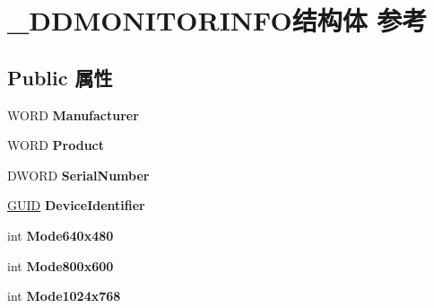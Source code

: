 \hypertarget{struct___d_d_m_o_n_i_t_o_r_i_n_f_o}{}\section{\+\_\+\+D\+D\+M\+O\+N\+I\+T\+O\+R\+I\+N\+F\+O结构体 参考}
\label{struct___d_d_m_o_n_i_t_o_r_i_n_f_o}
\subsection*{Public 属性}
\begin{DoxyCompactItemize}
\item 
\mbox{\label{struct___d_d_m_o_n_i_t_o_r_i_n_f_o_a0c4b7395b513639ca186caef7311f77b}} 
W\+O\+RD {\bfseries Manufacturer}
\item 
\mbox{\label{struct___d_d_m_o_n_i_t_o_r_i_n_f_o_a156665f939b835820e175f2d6113224d}} 
W\+O\+RD {\bfseries Product}
\item 
\mbox{\label{struct___d_d_m_o_n_i_t_o_r_i_n_f_o_a01c1932155065ae40ebde50055bbad7f}} 
D\+W\+O\+RD {\bfseries Serial\+Number}
\item 
\mbox{\label{struct___d_d_m_o_n_i_t_o_r_i_n_f_o_a126f637f04689578b5c8b967590083a9}} 
\hyperlink{interface_g_u_i_d}{G\+U\+ID} {\bfseries Device\+Identifier}
\item 
\mbox{\label{struct___d_d_m_o_n_i_t_o_r_i_n_f_o_a7f1a679c3bc7632dfa2c2d491e607954}} 
int {\bfseries Mode640x480}
\item 
\mbox{\label{struct___d_d_m_o_n_i_t_o_r_i_n_f_o_ad872a89f88dc3178011c9d4b64e43d2d}} 
int {\bfseries Mode800x600}
\item 
\mbox{\label{struct___d_d_m_o_n_i_t_o_r_i_n_f_o_a061e96768c62df0b8fcb8236c3d6fe63}} 
int {\bfseries Mode1024x768}
\item 
\mbox{\label{struct___d_d_m_o_n_i_t_o_r_i_n_f_o_ad670547d41da503dfef25ba3d00f10b4}} 

\end{DoxyCompactItemize}

